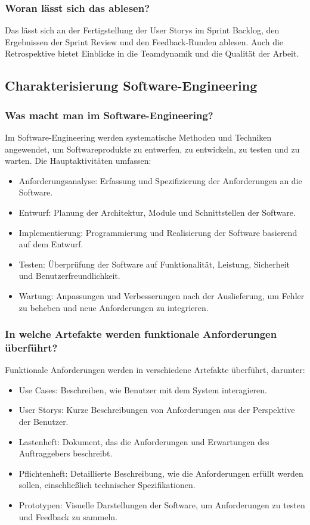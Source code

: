 \documentclass[main.tex]{subfiles}
\begin{document}
\subsubsection*{Woran lässt sich das ablesen?}
Das lässt sich an der Fertigstellung der \glspl{User Story} im \gls{Sprint Backlog}, den Ergebnissen der \gls{Sprint Review} und den Feedback-Runden ablesen. Auch die Retrospektive bietet Einblicke in die Teamdynamik und die Qualität der Arbeit.

\subsection{Charakterisierung Software-Engineering}
\subsubsection*{Was macht man im Software-Engineering?}
Im Software-Engineering werden systematische Methoden und Techniken angewendet, um Softwareprodukte zu entwerfen, zu entwickeln, zu testen und zu warten. Die Hauptaktivitäten umfassen:
\begin{itemize}
    \item Anforderungsanalyse: Erfassung und Spezifizierung der Anforderungen an die Software.
    \item Entwurf: Planung der Architektur, Module und Schnittstellen der Software.
    \item Implementierung: Programmierung und Realisierung der Software basierend auf dem Entwurf.
    \item Testen: Überprüfung der Software auf Funktionalität, Leistung, Sicherheit und Benutzerfreundlichkeit.
    \item Wartung: Anpassungen und Verbesserungen nach der Auslieferung, um Fehler zu beheben und neue Anforderungen zu integrieren.
\end{itemize}

\subsubsection*{In welche Artefakte werden funktionale Anforderungen überführt?}
Funktionale Anforderungen werden in verschiedene Artefakte überführt, darunter:
\begin{itemize}
    \item \glspl{Use Case}: Beschreiben, wie Benutzer mit dem System interagieren.
    \item \glspl{User Story}: Kurze Beschreibungen von Anforderungen aus der Perspektive der Benutzer.
    \item \gls{Lastenheft}: Dokument, das die Anforderungen und Erwartungen des Auftraggebers beschreibt.
    \item \gls{Pflichtenheft}: Detaillierte Beschreibung, wie die Anforderungen erfüllt werden sollen, einschließlich technischer Spezifikationen.
    \item Prototypen: Visuelle Darstellungen der Software, um Anforderungen zu testen und Feedback zu sammeln.
\end{itemize}
\end{document}
